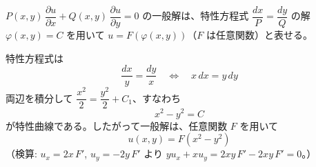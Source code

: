 
$P(x,y)\,\dfrac{\partial u}{\partial x} + Q(x,y)\,\dfrac{\partial u}{\partial y} = 0$ の一般解は、特性方程式 $\dfrac{dx}{P} = \dfrac{dy}{Q}$ の解 $\varphi(x,y) = C$ を用いて $u = F(\varphi(x,y))$（$F$ は任意関数）と表せる。

特性方程式は
\[
\frac{dx}{y} = \frac{dy}{x}
\quad\Longleftrightarrow\quad
x\,dx = y\,dy
\]
両辺を積分して $\dfrac{x^{2}}{2} = \dfrac{y^{2}}{2} + C_{1}$、すなわち
\[
x^{2} - y^{2} = C
\]
が特性曲線である。したがって一般解は、任意関数 $F$ を用いて
\[
\boxed{\; u(x,y) = F(x^{2} - y^{2}) \;}
\]
（検算: $u_x = 2x\,F'$, $u_y = -2y\,F'$ より $y u_x + x u_y = 2xy\,F' - 2xy\,F' = 0$。）
